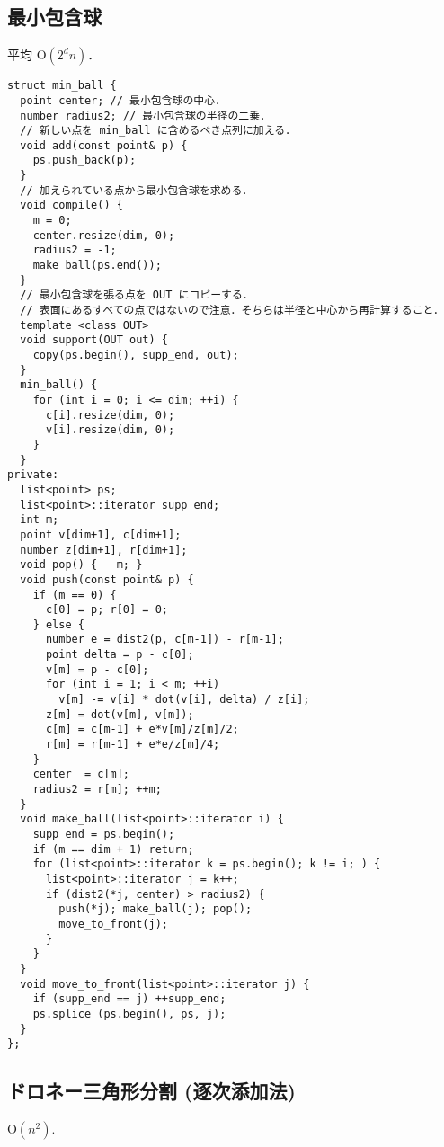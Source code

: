 \subsection{最小包含球}

平均 $\mathrm{O}(2^d n)$．


\begin{lstlisting}
struct min_ball {
  point center; // 最小包含球の中心．
  number radius2; // 最小包含球の半径の二乗．
  // 新しい点を min_ball に含めるべき点列に加える．
  void add(const point& p) {
    ps.push_back(p);
  }
  // 加えられている点から最小包含球を求める．
  void compile() {
    m = 0;
    center.resize(dim, 0);
    radius2 = -1;
    make_ball(ps.end());
  }
  // 最小包含球を張る点を OUT にコピーする．
  // 表面にあるすべての点ではないので注意．そちらは半径と中心から再計算すること．
  template <class OUT>
  void support(OUT out) {
    copy(ps.begin(), supp_end, out);
  }
  min_ball() {
    for (int i = 0; i <= dim; ++i) {
      c[i].resize(dim, 0);
      v[i].resize(dim, 0);
    }
  }
private:
  list<point> ps;
  list<point>::iterator supp_end;
  int m;
  point v[dim+1], c[dim+1];
  number z[dim+1], r[dim+1];
  void pop() { --m; }
  void push(const point& p) {
    if (m == 0) {
      c[0] = p; r[0] = 0;
    } else {
      number e = dist2(p, c[m-1]) - r[m-1];
      point delta = p - c[0];
      v[m] = p - c[0];
      for (int i = 1; i < m; ++i)
        v[m] -= v[i] * dot(v[i], delta) / z[i];
      z[m] = dot(v[m], v[m]);
      c[m] = c[m-1] + e*v[m]/z[m]/2;
      r[m] = r[m-1] + e*e/z[m]/4;
    }
    center  = c[m];
    radius2 = r[m]; ++m;
  }
  void make_ball(list<point>::iterator i) {
    supp_end = ps.begin();
    if (m == dim + 1) return;
    for (list<point>::iterator k = ps.begin(); k != i; ) {
      list<point>::iterator j = k++;
      if (dist2(*j, center) > radius2) {
        push(*j); make_ball(j); pop();
        move_to_front(j);
      }
    }
  }
  void move_to_front(list<point>::iterator j) {
    if (supp_end == j) ++supp_end;
    ps.splice (ps.begin(), ps, j);
  }
};
\end{lstlisting}



\subsection{ドロネー三角形分割 (逐次添加法)}

$\mathrm{O}(n^2)$. 


